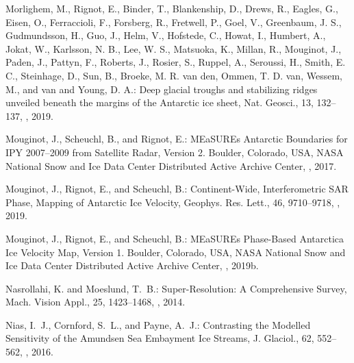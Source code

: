 \documentclass[tc, noline]{copernicus}
\begin{document}
\begin{thebibliography}{95}
Morlighem, M., Rignot, E., Binder, T., Blankenship, D., Drews, R., Eagles, G., Eisen, O., Ferraccioli, F., Forsberg, R., Fretwell, P., Goel, V., Greenbaum, J. S., Gudmundsson, H., Guo, J., Helm, V., Hofstede, C., Howat, I., Humbert, A., Jokat, W., Karlsson, N. B., Lee, W. S., Matsuoka, K., Millan, R., Mouginot, J., Paden, J., Pattyn, F., Roberts, J., Rosier, S., Ruppel, A., Seroussi, H., Smith, E. C., Steinhage, D., Sun, B., Broeke, M. R. van den, Ommen, T. D. van, Wessem, M., and van and Young, D. A.: Deep glacial troughs and stabilizing ridges unveiled beneath the margins of the Antarctic ice sheet, Nat. Geosci., 13, 132--137, , 2019.

Mouginot, J., Scheuchl, B., and Rignot, E.: MEaSUREs Antarctic Boundaries for IPY 2007--2009 from Satellite Radar, Version 2. Boulder, Colorado, USA, NASA National Snow and Ice Data Center Distributed Active Archive Center, , 2017.

Mouginot, J., Rignot, E., and Scheuchl, B.:
Continent-Wide, Interferometric SAR Phase, Mapping of Antarctic Ice Velocity,
Geophys. Res. Lett.,
46, 9710--9718, , 2019{}.

Mouginot, J., Rignot, E., and Scheuchl, B.: MEaSUREs Phase-Based Antarctica Ice Velocity Map, Version 1. Boulder, Colorado, USA, NASA National Snow and Ice Data Center Distributed Active Archive Center, , 2019b.


Nasrollahi, K. and Moeslund, T.~B.:
Super-Resolution: A Comprehensive Survey,
Mach. Vision Appl.,
25, 1423--1468, , 2014.

Nias, I.~J., Cornford, S.~L., and Payne, A.~J.:
Contrasting the Modelled Sensitivity of the Amundsen Sea Embayment Ice Streams,
J. Glaciol.,
62, 552--562, , 2016.



\end{thebibliography}
\end{document}

